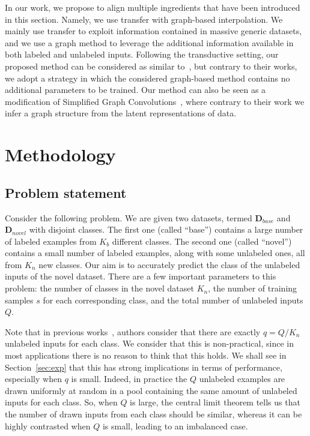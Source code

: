 \documentclass[a4paper,conference]{IEEEtran}
\begin{document}
In our work, we propose to align multiple ingredients that have been introduced in this section. Namely, we use transfer with graph-based interpolation. We mainly use transfer to exploit information contained in massive generic datasets, and we use a graph method to leverage the additional information available in both labeled and unlabeled inputs. Following the transductive setting, our proposed method can be considered as similar to~\cite{liu2018learning,garcia2017few,kim2019edge,gidaris2019generating}, but contrary to their works, we adopt a strategy in which the considered graph-based method contains no additional parameters to be trained. Our method can also be seen as a modification of Simplified Graph Convolutions~\cite{wu2019simplifying}, where contrary to their work we infer a graph structure from the latent representations of data.

\section{Methodology}
\label{sec:met}

\subsection{Problem statement}
Consider the following problem. We are given two datasets, termed $\mathbf{D}_{base}$ and $\mathbf{D}_{novel}$ with disjoint classes. The first one (called ``base'') contains a large number of labeled examples from $K_b$ different classes. The second one (called ``novel'') contains a small number of labeled examples, along with some unlabeled ones, all from $K_n$ new classes. Our aim is to accurately predict the class of the unlabeled inputs of the novel dataset. There are a few important parameters to this problem: the number of classes in the novel dataset $K_n$, the number of training samples $s$ for each corresponding class, and the total number of unlabeled inputs $Q$.

Note that in previous works~\cite{liu2018learning}, authors consider that there are exactly $q = Q/K_n$ unlabeled inputs for each class. We consider that this is non-practical, since in most applications there is no reason to think that this holds. We shall see in Section~\ref{sec:exp} that this has strong implications in terms of performance, especially when $q$ is small. Indeed, in practice the $Q$ unlabeled examples are drawn uniformly at random in a pool containing the same amount of unlabeled inputs for each class. So, when $Q$ is large, the central limit theorem tells us that the number of drawn inputs from each class should be similar, whereas it can be highly contrasted when $Q$ is small, leading to an imbalanced case.
\end{document}

